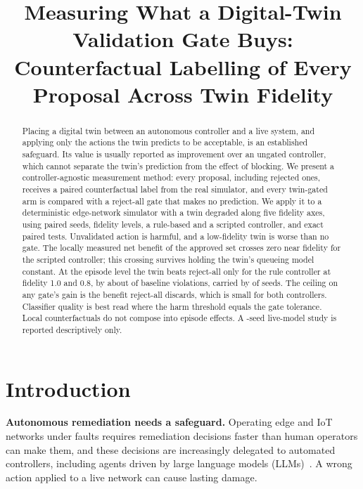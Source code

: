 \documentclass[conference]{IEEEtran}
\begin{document}
\title{Measuring What a Digital-Twin Validation Gate Buys:\\Counterfactual Labelling of Every Proposal Across Twin Fidelity}

\author{
}

\maketitle

\begin{abstract}
Placing a digital twin between an autonomous controller and a live system, and applying only the actions the twin predicts to be acceptable, is an established safeguard. Its value is usually reported as improvement over an ungated controller, which cannot separate the twin's prediction from the effect of blocking. We present a controller-agnostic measurement method: every proposal, including rejected ones, receives a paired counterfactual label from the real simulator, and every twin-gated arm is compared with a reject-all gate that makes no prediction. We apply it to a deterministic edge-network simulator with a twin degraded along five fidelity axes, using \NSeeds{} paired seeds, \NFidelity{} fidelity levels, a rule-based and a scripted controller, and exact paired tests. Unvalidated action is harmful, and a low-fidelity twin is worse than no gate. The locally measured net benefit of the approved set crosses zero near fidelity \ScrCrossII{} for the scripted controller; this crossing survives holding the twin's queueing model constant. At the episode level the twin beats reject-all only for the rule controller at fidelity 1.0 and 0.8, by about \RuleTenPctBaseline{} of baseline violations, carried by \RuleTenPctSeeds{} of seeds. The ceiling on any gate's gain is the benefit reject-all discards, which is small for both controllers. Classifier quality is best read where the harm threshold equals the gate tolerance. Local counterfactuals do not compose into episode effects. A \LLMSeeds-seed live-model study is reported descriptively only.
\end{abstract}

\section{Introduction}
\textbf{Autonomous remediation needs a safeguard.} Operating edge and IoT networks under faults requires remediation decisions faster than human operators can make them, and these decisions are increasingly delegated to automated controllers, including agents driven by large language models (LLMs)~\cite{microremed,nika,netagentbench}. A wrong action applied to a live network can cause lasting damage.
\end{document}
